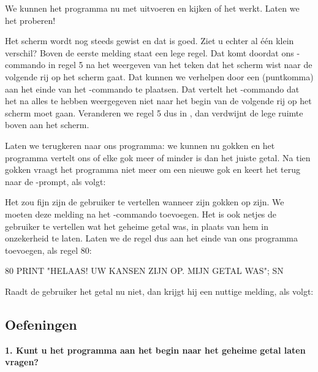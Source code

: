 
\needspace{4cm}
We kunnen het programma nu met  uitvoeren en kijken of het werkt. Laten we het proberen!


Het scherm wordt nog steeds gewist en dat is goed. Ziet u echter al één klein verschil? Boven de eerste melding staat een lege regel. Dat komt doordat ons -commando in regel 5 na het weergeven van het teken dat het scherm wist naar de volgende rij op het scherm gaat. Dat kunnen we verhelpen door een \stw{;} (puntkomma) aan het einde van het -commando te plaatsen. Dat vertelt het -commando dat het na alles te hebben weergegeven niet naar het begin van de volgende rij op het scherm moet gaan. Veranderen we regel 5 dus in , dan verdwijnt de lege ruimte boven aan het scherm.

\needspace{4cm}
Laten we terugkeren naar ons programma: we kunnen nu gokken en het programma vertelt ons of elke gok meer of minder is dan het juiste getal. Na tien gokken vraagt het programma niet meer om een nieuwe gok en keert het terug naar de -prompt, als volgt:


\needspace{2cm}
Het zou fijn zijn de gebruiker te vertellen wanneer zijn gokken op zijn. We moeten deze melding na het -commando toevoegen. Het is ook netjes de gebruiker te vertellen wat het geheime getal was, in plaats van hem in onzekerheid te laten. Laten we de regel dus aan het einde van ons programma toevoegen, als regel 80:

\begin{screencode}
80 PRINT "HELAAS! UW KANSEN ZIJN OP. MIJN GETAL WAS"; SN
\end{screencode}

\needspace{4cm}
Raadt de gebruiker het getal nu niet, dan krijgt hij een nuttige melding, als volgt:


\subsection{Oefeningen}

{\bf 1. Kunt u het programma aan het begin naar het geheime getal laten vragen?}

